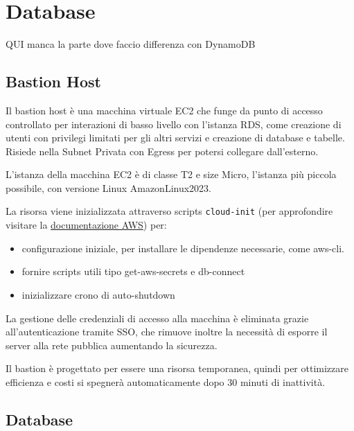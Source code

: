 \section{Database}

QUI manca la parte dove faccio differenza con DynamoDB


\subsection{Bastion Host}

Il bastion host è una macchina virtuale EC2 che funge da punto di accesso controllato per interazioni di basso livello con l’istanza RDS, come creazione di utenti con privilegi limitati per gli altri servizi e creazione di database e tabelle.  Risiede nella Subnet Privata con Egress per potersi collegare dall’esterno.

\vspace{0,3cm}

L'istanza della macchina EC2 è di classe T2 e size Micro, l'istanza più piccola possibile, con versione Linux AmazonLinux2023.

La risorsa viene inizializzata attraverso scripts \texttt{cloud-init} (per approfondire visitare la \href{https://docs.aws.amazon.com/AWSEC2/latest/UserGuide/user-data.html}{documentazione AWS}) per:

\begin{itemize}
    \item  configurazione iniziale, per installare le dipendenze necessarie, come aws-cli. 
    \item fornire scripts utili tipo get-aws-secrets e db-connect
    \item inizializzare crono di auto-shutdown
\end{itemize}

La gestione delle credenziali di accesso alla macchina è eliminata grazie all’autenticazione tramite SSO, che rimuove inoltre la necessità di esporre il server alla rete pubblica aumentando la sicurezza.

Il bastion è progettato per essere una risorsa temporanea, quindi per ottimizzare efficienza e costi si spegnerà automaticamente dopo 30 minuti di inattività.


\subsection{Database}

